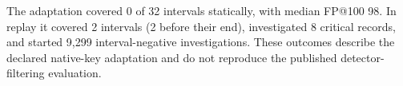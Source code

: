 The adaptation covered 0 of 32 intervals statically, with median FP@100 98. In replay it covered 2 intervals (2 before their end), investigated 8 critical records, and started 9,299 interval-negative investigations. These outcomes describe the declared native-key adaptation and do not reproduce the published detector-filtering evaluation.
